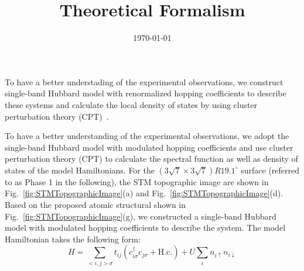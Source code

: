 \documentclass[aps,prl,reprint,amsfonts,amsmath,amssymb,showpacs,groupedaddress,superscriptaddress,onecolumn]{revtex4-1}
\begin{document}
\title{Theoretical Formalism}

\date{\today}

\maketitle

To have a better understading of the experimental observations, we construct single-band Hubbard model with renormalized hopping coefficients to describe these systems and calculate the local density of states by using cluster perturbation theory (CPT)~\cite{PhysRevB.48.418,PhysRevLett.84.522}.

To have a better understanding of the experimental observations, we adopt the single-band Hubbard model with modulated hopping coefficients and use cluster perturbation theory (CPT)\cite{PhysRevB.48.418,PhysRevLett.84.522} to calculate the spectral function as well as density of states of the model Hamiltonians. For the $(3\sqrt{7} \times 3\sqrt{7})R19.1^\circ$ surface (referred to as Phase 1 in the following), the STM topographic image are shown in Fig.~\ref{fig:STMTopographicImage}(a) and Fig.~\ref{fig:STMTopographicImage}(d). Based on the proposed atomic structural shown in Fig.~\ref{fig:STMTopographicImage}(g), we constructed a single-band Hubbard model with modulated hopping coefficients to describe the system. The model Hamiltonian takes the following form:
\begin{equation}
    H = \sum_{<i,j>\sigma} t_{ij}(c_{i\sigma}^{\dagger}c_{j\sigma} + \text{H.c.}) + U \sum_{i} n_{i\uparrow} n_{i\downarrow}
    \label{eq:ModelHamiltonian}
\end{equation}
\end{document}
